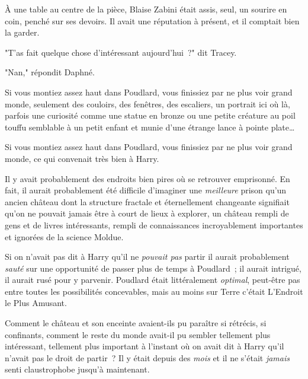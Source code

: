 À une table au centre de la pièce, Blaise Zabini était assis, seul, un sourire en coin, penché sur ses devoirs. Il avait une réputation à présent, et il comptait bien la garder.




"T'as fait quelque chose d'intéressant aujourd'hui~?" dit Tracey.

"Nan," répondit Daphné.


Si vous montiez assez haut dans Poudlard, vous finissiez par ne plus voir grand monde, seulement des couloirs, des fenêtres, des escaliers, un portrait ici où là, parfois une curiosité comme une statue en bronze ou une petite créature au poil touffu semblable à un petit enfant et munie d'une étrange lance à pointe plate…

Si vous montiez assez haut dans Poudlard, vous finissiez par ne plus voir grand monde, ce qui convenait très bien à Harry.

Il y avait probablement des endroits bien pires où se retrouver emprisonné. En fait, il aurait probablement été difficile d'imaginer une \emph{meilleure} prison qu'un ancien château dont la structure fractale et éternellement changeante signifiait qu'on ne pouvait jamais être à court de lieux à explorer, un château rempli de gens et de livres intéressants, rempli de connaissances incroyablement importantes et ignorées de la science Moldue.

Si on n'avait pas dit à Harry qu'il ne \emph{pouvait pas} partir il aurait probablement \emph{sauté} sur une opportunité de passer plus de temps à Poudlard~; il aurait intrigué, il aurait rusé pour y parvenir. Poudlard était littéralement \emph{optimal}, peut-être pas entre toutes les possibilités concevables, mais au moins sur Terre c'était L'Endroit le Plus Amusant.

Comment le château et son enceinte avaient-ils pu paraître si rétrécis, si confinants, comment le reste du monde avait-il pu sembler tellement plus intéressant, tellement plus important à l'instant où on avait dit à Harry qu'il n'avait pas le droit de partir~? Il y était depuis des \emph{mois} et il ne s'était \emph{jamais} senti claustrophobe jusqu'à maintenant.

